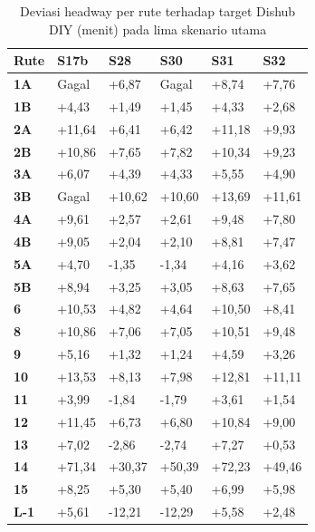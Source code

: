 \begin{table}[h]
	\centering
	\scriptsize
	\caption{Deviasi headway per rute terhadap target Dishub DIY (menit) pada lima skenario utama}
	\label{tab:deviasi-5-skenario}
	\begin{tabularx}{\linewidth}{|l|X|X|X|X|X|}
		\hline
		\textbf{Rute} & \textbf{S17b} & \textbf{S28} & \textbf{S30} & \textbf{S31} & \textbf{S32} \\ \hline
		\textbf{1A} & Gagal & +6,87 & Gagal & +8,74 & +7,76 \\ \hline
		\textbf{1B} & +4,43 & +1,49 & +1,45 & +4,33 & +2,68 \\ \hline
		\textbf{2A} & +11,64 & +6,41 & +6,42 & +11,18 & +9,93 \\ \hline
		\textbf{2B} & +10,86 & +7,65 & +7,82 & +10,34 & +9,23 \\ \hline
		\textbf{3A} & +6,07 & +4,39 & +4,33 & +5,55 & +4,90 \\ \hline
		\textbf{3B} & Gagal & +10,62 & +10,60 & +13,69 & +11,61 \\ \hline
		\textbf{4A} & +9,61 & +2,57 & +2,61 & +9,48 & +7,80 \\ \hline
		\textbf{4B} & +9,05 & +2,04 & +2,10 & +8,81 & +7,47 \\ \hline
		\textbf{5A} & +4,70 & -1,35 & -1,34 & +4,16 & +3,62 \\ \hline
		\textbf{5B} & +8,94 & +3,25 & +3,05 & +8,63 & +7,65 \\ \hline
		\textbf{6} & +10,53 & +4,82 & +4,64 & +10,50 & +8,41 \\ \hline
		\textbf{8} & +10,86 & +7,06 & +7,05 & +10,51 & +9,48 \\ \hline
		\textbf{9} & +5,16 & +1,32 & +1,24 & +4,59 & +3,26 \\ \hline
		\textbf{10} & +13,53 & +8,13 & +7,98 & +12,81 & +11,11 \\ \hline
		\textbf{11} & +3,99 & -1,84 & -1,79 & +3,61 & +1,54 \\ \hline
		\textbf{12} & +11,45 & +6,73 & +6,80 & +10,84 & +9,00 \\ \hline
		\textbf{13} & +7,02 & -2,86 & -2,74 & +7,27 & +0,53 \\ \hline
		\textbf{14} & +71,34 & +30,37 & +50,39 & +72,23 & +49,46 \\ \hline
		\textbf{15} & +8,25 & +5,30 & +5,40 & +6,99 & +5,98 \\ \hline
		\textbf{L-1} & +5,61 & -12,21 & -12,29 & +5,58 & +2,48 \\ \hline
	\end{tabularx}
\end{table}

